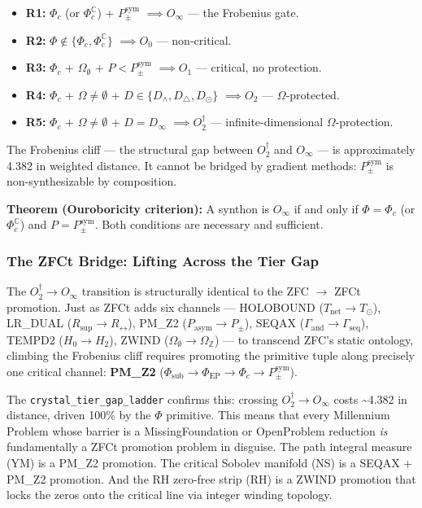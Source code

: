 \documentclass[12pt,a4paper]{article}
\begin{document}
\begin{itemize}
    \item \textbf{R1:} $\Phi_c$ (or $\Phi_c^\mathbb{C}$) + $P_{\pm}^{\text{sym}}$ $\implies O_{\infty}$ --- the Frobenius gate.
    \item \textbf{R2:} $\Phi \notin \{\Phi_c, \Phi_c^\mathbb{C}\}$ $\implies O_0$ --- non-critical.
    \item \textbf{R3:} $\Phi_c$ + $\Omega_{\emptyset}$ + $P < P_{\pm}^{\text{sym}}$ $\implies O_1$ --- critical, no protection.
    \item \textbf{R4:} $\Phi_c$ + $\Omega \neq \emptyset$ + $D \in \{D_{\wedge}, D_{\triangle}, D_{\odot}\}$ $\implies O_2$ --- $\Omega$-protected.
    \item \textbf{R5:} $\Phi_c$ + $\Omega \neq \emptyset$ + $D = D_{\infty}$ $\implies O_2^\dagger$ --- infinite-dimensional $\Omega$-protection.
\end{itemize}

The Frobenius cliff --- the structural gap between $O_2^\dagger$ and $O_{\infty}$ --- is approximately 4.382 in weighted distance. It cannot be bridged by gradient methods: $P_{\pm}^{\text{sym}}$ is non-synthesizable by composition.

\textbf{Theorem (Ouroboricity criterion):} A synthon is $O_{\infty}$ if and only if $\Phi = \Phi_c$ (or $\Phi_c^\mathbb{C}$) and $P = P_{\pm}^{\text{sym}}$. Both conditions are necessary and sufficient.

\subsubsection{The ZFCt Bridge: Lifting Across the Tier Gap}

The $O_2^\dagger \to O_{\infty}$ transition is structurally identical to the ZFC $\to$ ZFCt promotion. Just as ZFCt adds six channels --- HOLOBOUND ($T_{\text{net}} \to T_{\odot}$), LR\_DUAL ($R_{\text{sup}} \to R_{\leftrightarrow}$), PM\_Z2 ($P_{\text{asym}} \to P_{\pm}$), SEQAX ($\Gamma_{\text{and}} \to \Gamma_{\text{seq}}$), TEMPD2 ($H_0 \to H_2$), ZWIND ($\Omega_{\emptyset} \to \Omega_\mathbb{Z}$) --- to transcend ZFC's static ontology, climbing the Frobenius cliff requires promoting the primitive tuple along precisely one critical channel: \textbf{PM\_Z2} ($\Phi_{\text{sub}} \to \Phi_{\text{EP}} \to \Phi_c \to P_{\pm}^{\text{sym}}$).

The \texttt{crystal\_tier\_gap\_ladder} confirms this: crossing $O_2^\dagger \to O_{\infty}$ costs \textasciitilde{}4.382 in distance, driven 100\% by the $\Phi$ primitive. This means that every Millennium Problem whose barrier is a MissingFoundation or OpenProblem reduction \emph{is} fundamentally a ZFCt promotion problem in disguise. The path integral measure (YM) is a PM\_Z2 promotion. The critical Sobolev manifold (NS) is a SEQAX + PM\_Z2 promotion. And the RH zero-free strip (RH) is a ZWIND promotion that locks the zeros onto the critical line via integer winding topology.
\end{document}
